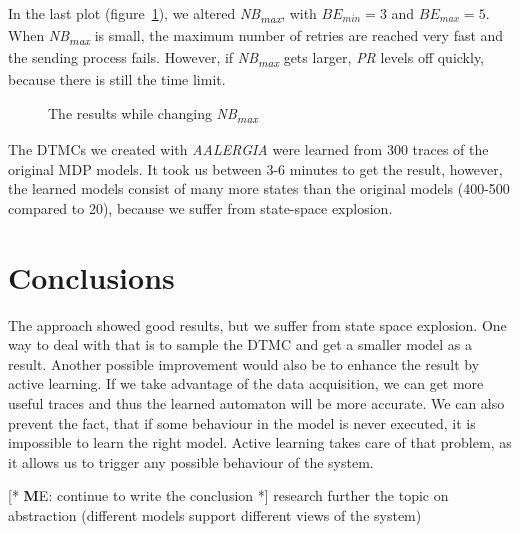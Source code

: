 \documentclass[
a4paper,
12pt
]{scrartcl}
\newcommand\me[1]{ [* {\textbf ME:} #1 *]}
\begin{document}
In the last plot (figure~\ref{fig:nbmax}), we altered \textit{NB\textsubscript{max}}, with $BE_{min}=3$ and $BE_{max}=5$. When \textit{NB\textsubscript{max}} is small, the maximum number of retries are reached very fast and the sending process fails. However, if \textit{NB\textsubscript{max}} gets larger, \textit{PR} levels off quickly, because there is still the time limit.

\begin{figure}[H]
\centering
 \caption{The results while changing \textit{NB\textsubscript{max}}}
   \label{fig:nbmax}
\end{figure}

The DTMCs we created with \emph{AALERGIA} were learned from 300 traces of the original MDP models. It took us between 3-6 minutes to get the result, however, the learned  models consist of many more states than the original models (400-500 compared to 20), because we suffer from state-space explosion.

\section{Conclusions}
The approach showed good results, but we suffer from state space explosion. One way to deal with that is to sample the DTMC and get a smaller model as a result. Another possible improvement would also be to enhance the result by active learning. If we take advantage of the data acquisition, we can get more useful traces and thus the learned automaton will be more accurate. We can also prevent the fact, that if some behaviour in the model is never executed, it is impossible to learn the right model. Active learning takes care of that problem, as it allows us to trigger any possible behaviour of the system.

\me{continue to write the conclusion}
research further the topic on abstraction (different models support different views of the system)

\appendix
 
 
\end{document}
